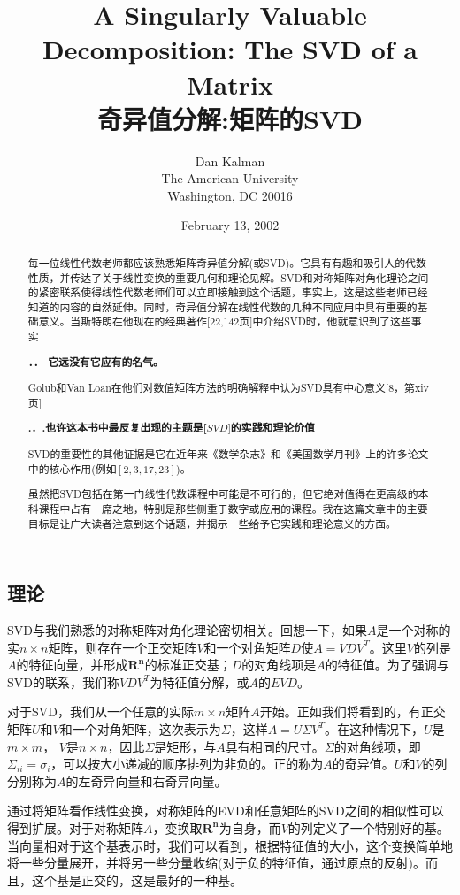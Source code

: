 \documentclass[11pt,a4paper,twoside]{article}
\title{A Singularly Valuable Decomposition: The SVD
of a Matrix\\
奇异值分解:矩阵的SVD
}
\author{Dan Kalman\\
The American University\\
Washington, DC 20016}
\date{February 13, 2002}
\begin{document}
\begin{CJK}{UTF8}{gbsn}
\maketitle

\begin{abstract}
每一位线性代数老师都应该熟悉矩阵奇异值分解(或SVD)。它具有有趣和吸引人的代数性质，并传达了关于线性变换的重要几何和理论见解。SVD和对称矩阵对角化理论之间的紧密联系使得线性代数老师们可以立即接触到这个话题，事实上，这是这些老师已经知道的内容的自然延伸。同时，奇异值分解在线性代数的几种不同应用中具有重要的基础意义。当斯特朗在他现在的经典著作[22,142页]中介绍SVD时，他就意识到了这些事实

\textbf{．． 它远没有它应有的名气。}

Golub和Van Loan在他们对数值矩阵方法的明确解释中认为SVD具有中心意义[8，第xiv页]

\textbf{.．.也许这本书中最反复出现的主题是[$S V D]$的实践和理论价值}

SVD的重要性的其他证据是它在近年来《数学杂志》和《美国数学月刊》上的许多论文中的核心作用(例如$[2,3,17,23]$)。

虽然把SVD包括在第一门线性代数课程中可能是不可行的，但它绝对值得在更高级的本科课程中占有一席之地，特别是那些侧重于数字或应用的课程。我在这篇文章中的主要目标是让广大读者注意到这个话题，并揭示一些给予它实践和理论意义的方面。
\end{abstract}


\section{理论}
SVD与我们熟悉的对称矩阵对角化理论密切相关。回想一下，如果$A$是一个对称的实$n \times n$矩阵，则存在一个正交矩阵$V$和一个对角矩阵$D$使$A=V D V^{T}$。这里$V$的列是$A$的特征向量，并形成$\mathbf{R}^{\mathbf{n}}$的标准正交基；$D$的对角线项是$A$的特征值。为了强调与SVD的联系，我们称$V D V^{T}$为特征值分解，或$A$的$EVD $。

对于SVD，我们从一个任意的实际$m \times n$矩阵$A$开始。正如我们将看到的，有正交矩阵$U$和$V$和一个对角矩阵，这次表示为$\Sigma$，这样$ A =U \Sigma V^{T}$。在这种情况下，$U$是$m \times m$， $V$是$n \times n$，因此$\Sigma$是矩形，与$A$具有相同的尺寸。$\Sigma$的对角线项，即$\Sigma_{i i}=\sigma_{i}$，可以按大小递减的顺序排列为非负的。正的称为$A$的奇异值。$U$和$V$的列分别称为$A$的左奇异向量和右奇异向量。

通过将矩阵看作线性变换，对称矩阵的EVD和任意矩阵的SVD之间的相似性可以得到扩展。对于对称矩阵$ A $，变换取$\mathbf{R}^{\mathbf{n}}$为自身，而$V$的列定义了一个特别好的基。当向量相对于这个基表示时，我们可以看到，根据特征值的大小，这个变换简单地将一些分量展开，并将另一些分量收缩(对于负的特征值，通过原点的反射)。而且，这个基是正交的，这是最好的一种基。



\end{CJK}
\end{document}

